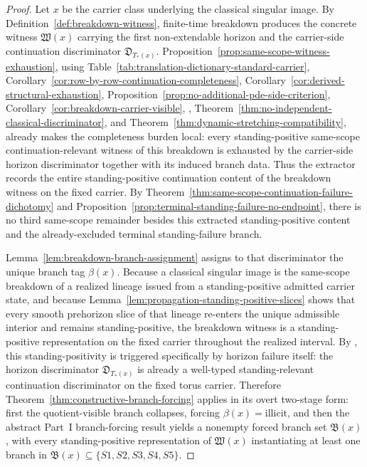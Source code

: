 \begin{proof}
Let $x$ be the carrier class underlying the classical singular image. By Definition~\ref{def:breakdown-witness}, finite-time breakdown produces the concrete witness $\mathfrak W(x)$ carrying the first non-extendable horizon and the carrier-side continuation discriminator $\mathfrak D_{T_*(x)}$. Proposition~\ref{prop:same-scope-witness-exhaustion}, using Table~\ref{tab:translation-dictionary-standard-carrier}, Corollary~\ref{cor:row-by-row-continuation-completeness}, Corollary~\ref{cor:derived-structural-exhaustion}, Proposition~\ref{prop:no-additional-pde-side-criterion}, Corollary~\ref{cor:breakdown-carrier-visible}, \HorizonDetectabilityRef{}, Theorem~\ref{thm:no-independent-classical-discriminator}, and Theorem~\ref{thm:dynamic-stretching-compatibility}, already makes the completeness burden local: every standing-positive same-scope continuation-relevant witness of this breakdown is exhausted by the carrier-side horizon discriminator together with its induced branch data. Thus the extractor records the entire standing-positive continuation content of the breakdown witness on the fixed carrier. By Theorem~\ref{thm:same-scope-continuation-failure-dichotomy} and Proposition~\ref{prop:terminal-standing-failure-no-endpoint}, there is no third same-scope remainder besides this extracted standing-positive content and the already-excluded terminal standing-failure branch.

Lemma~\ref{lem:breakdown-branch-assignment} assigns to that discriminator the unique branch tag $\beta(x)$. Because a classical singular image is the same-scope breakdown of a realized lineage issued from a standing-positive admitted carrier state, and because Lemma~\ref{lem:propagation-standing-positive-slices} shows that every smooth prehorizon slice of that lineage re-enters the unique admissible interior and remains standing-positive, the breakdown witness is a standing-positive representation on the fixed carrier throughout the realized interval. By \HorizonDetectabilityRef{}, this standing-positivity is triggered specifically by horizon failure itself: the horizon discriminator $\mathfrak D_{T_*(x)}$ is already a well-typed standing-relevant continuation discriminator on the fixed torus carrier. Therefore Theorem~\ref{thm:constructive-branch-forcing} applies in its overt two-stage form: first the quotient-visible branch collapses, forcing $\beta(x)=\mathrm{illicit}$, and then the abstract Part~I branch-forcing result yields a nonempty forced branch set $\mathfrak B(x)$, with every standing-positive representation of $\mathfrak W(x)$ instantiating at least one branch in $\mathfrak B(x)\subseteq\{S1,S2,S3,S4,S5\}$.


\end{proof}
